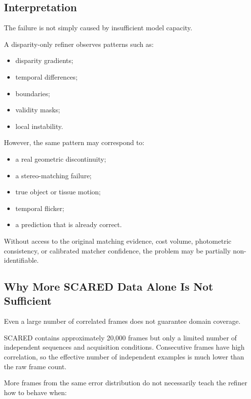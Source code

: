 \documentclass[11pt,a4paper]{article}
\begin{document}
\subsection{Interpretation}

The failure is not simply caused by insufficient model capacity.

A disparity-only refiner observes patterns such as:

\begin{itemize}[leftmargin=*]
    \item disparity gradients;
    \item temporal differences;
    \item boundaries;
    \item validity masks;
    \item local instability.
\end{itemize}

However, the same pattern may correspond to:

\begin{itemize}[leftmargin=*]
    \item a real geometric discontinuity;
    \item a stereo-matching failure;
    \item true object or tissue motion;
    \item temporal flicker;
    \item a prediction that is already correct.
\end{itemize}

Without access to the original matching evidence, cost volume, photometric
consistency, or calibrated matcher confidence, the problem may be partially
non-identifiable.

\subsection{Why More SCARED Data Alone Is Not Sufficient}

Even a large number of correlated frames does not guarantee domain coverage.

SCARED contains approximately 20,000 frames but only a limited number of independent
sequences and acquisition conditions. Consecutive frames have high correlation, so
the effective number of independent examples is much lower than the raw frame count.

More frames from the same error distribution do not necessarily teach the refiner
how to behave when:
\end{document}
